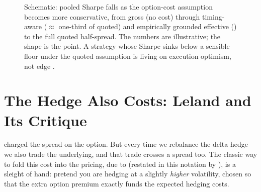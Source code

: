 \begin{figure}[ht]
\centering
{}
\caption{Schematic: pooled Sharpe falls as the option-cost assumption becomes more conservative, from gross (no cost) through timing-aware ($\approx$ one-third of quoted) and empirically grounded effective () to the full quoted half-spread. The numbers are illustrative; the shape is the point. A strategy whose Sharpe sinks below a sensible floor under the quoted assumption is living on execution optimism, not edge \citep{MuravyevPearson2020}.}
\label{fig:ivrv:cost-band}
\end{figure}

\section{The Hedge Also Costs: Leland and Its Critique}
\label{sec:ivrv:leland}

 charged the spread on the option. But every time we rebalance the delta hedge we also trade the underlying, and that trade crosses a spread too. The classic way to fold this cost into the pricing, due to \citet{Leland1985} (restated in this notation by \citealp{ZhaoZiemba2007}), is a sleight of hand: pretend you are hedging at a slightly \emph{higher} volatility, chosen so that the extra option premium exactly funds the expected hedging costs.

